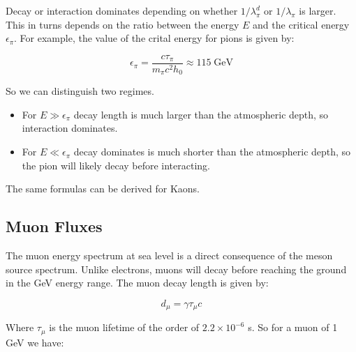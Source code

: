 \documentclass[
  letterpaper,
  DIV=11,
  numbers=noendperiod]{scrreprt}
\begin{document}
\begin{tcolorbox}[enhanced jigsaw, colframe=quarto-callout-note-color-frame, leftrule=.75mm, left=2mm, opacitybacktitle=0.6, colbacktitle=quarto-callout-note-color!10!white, coltitle=black, arc=.35mm, titlerule=0mm, toprule=.15mm, opacityback=0, bottomrule=.15mm, breakable, bottomtitle=1mm, rightrule=.15mm, toptitle=1mm, colback=white, title=\textcolor{quarto-callout-note-color}{\faInfo}\hspace{0.5em}{Critical energy for mesons, \(\pi\), \(K\)}]

Decay or interaction dominates depending on whether \(1/\lambda^d_\pi\)
or \(1/\lambda_\pi\) is larger. This in turns depends on the ratio
between the energy \(E\) and the critical energy \(\epsilon_\pi\). For
example, the value of the crital energy for pions is given by:

\[\epsilon_\pi = \frac{c\tau_\pi}{m_\pi c^2 h_0} \approx 115 \;\mathrm{ GeV}\]

So we can distinguish two regimes.

\begin{itemize}
\item
  For \(E \gg \epsilon_\pi\) decay length is much larger than the
  atmospheric depth, so interaction dominates.
\item
  For \(E \ll \epsilon_\pi\) decay dominates is much shorter than the
  atmospheric depth, so the pion will likely decay before interacting.
\end{itemize}

The same formulas can be derived for Kaons.

\end{tcolorbox}

\subsection{Muon Fluxes}\label{muon-fluxes}

The muon energy spectrum at sea level is a direct consequence of the
meson source spectrum. Unlike electrons, muons will decay before
reaching the ground in the GeV energy range. The muon decay length is
given by:

\[ d_\mu = \gamma \tau_\mu c\]

Where \(\tau_\mu\) is the muon lifetime of the order of
\(2.2\times 10^{-6}\) s. So for a muon of 1 GeV we have:
\end{document}
